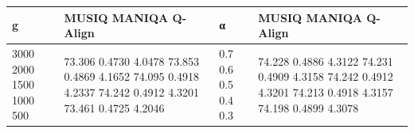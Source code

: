 \begin{tabular}{llll}
\toprule
g & MUSIQ MANIQA Q-Align & α & MUSIQ MANIQA Q-Align \\
\midrule
3000 2000 1500 1000 500 & 73.306 0.4730 4.0478 73.853 0.4869 4.1652 74.095 0.4918 4.2337 74.242 0.4912 4.3201 73.461 0.4725 4.2046 & 0.7 0.6 0.5 0.4 0.3 & 74.228 0.4886 4.3122 74.231 0.4909 4.3158 74.242 0.4912 4.3201 74.213 0.4918 4.3157 74.198 0.4899 4.3078 \\
\bottomrule
\end{tabular}
